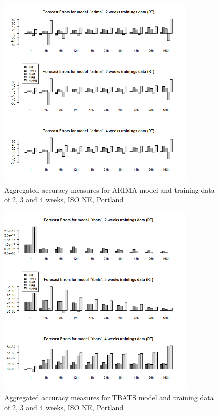 \begin{figure}[!ht]
	\centering
		\includegraphics[width=0.85\textwidth]{figures/appendix_forecast_results/rt_sim_4_x_1w_1w_arima.png}
	\caption{Aggregated accuracy measures for ARIMA model and training data of 2, 3 and 4 weeks, ISO NE, Portland}
	\label{fig:app_rt_sim_4_x_1w_1w_arima}
	\vspace*{-1.6in}
\end{figure}




\begin{figure}[!ht]
	\centering
		\includegraphics[width=0.85\textwidth]{figures/appendix_forecast_results/rt_sim_4_x_1w_1w_tbats.png}
	\caption{Aggregated accuracy measures for TBATS model and training data of 2, 3 and 4 weeks, ISO NE, Portland}
	\label{fig:app_rt_sim_4_x_1w_1w_tbats}
\end{figure}



